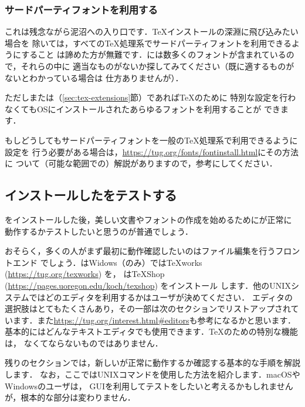 \documentclass[uplatex,dvipdfmx,tombow]{jsarticle}
\begin{document}
\subsubsection{サードパーティフォントを利用する}

これは残念ながら泥沼への入り口です．\TeX インストールの深淵に飛び込みたい場合を
除いては，すべての\TeX 処理系でサードパーティフォントを利用できるようにすること
は諦めた方が無難です．\TL には数多くのフォントが含まれているので，それらの中に
適当なものがないか探してみてください（既に適するものがないとわかっている場合は
仕方ありませんが）．

ただし\XeTeX または\LuaTeX （\ref{sec:tex-extensions}節）であれば\TeX のために
特別な設定を行わなくてもOSにインストールされたあらゆるフォントを利用することが
できます．

もしどうしてもサードパーティフォントを一般の\TeX 処理系で利用できるように設定を
行う必要がある場合は，\url{https://tug.org/fonts/fontinstall.html}にその方法に
ついて（可能な範囲での）解説がありますので，参考にしてください．

\subsection{インストールした\TL をテストする}
\label{sec:test-install}

\TL をインストールした後，美しい文書やフォントの作成を始めるために\TL が正常に
動作するかテストしたいと思うのが普通でしょう．

おそらく，多くの人がまず最初に動作確認したいのはファイル編集を行うフロントエンド
でしょう．\TL はWidows（のみ）では{\TeX}works (\url{https://tug.org/texworks}) を，
\MacTeX は{\TeX}Shop (\url{https://pages.uoregon.edu/koch/texshop}) をインストール
します．他のUNIXシステムではどのエディタを利用するかはユーザが決めてください．
エディタの選択肢はとてもたくさんあり，その一部は次のセクションでリストアップされて
います．また\url{https://tug.org/interest.html#editors}も参考になるかと思います．
基本的にはどんなテキストエディタでも使用できます．\TeX のための特別な機能は，
なくてならないものではありません．

残りのセクションでは，新しい\TL が正常に動作するか確認する基本的な手順を解説します．
なお，ここではUNIXコマンドを使用した方法を紹介します．macOSやWindowsのユーザは，
GUIを利用してテストをしたいと考えるかもしれませんが，根本的な部分は変わりません．
\end{document}

